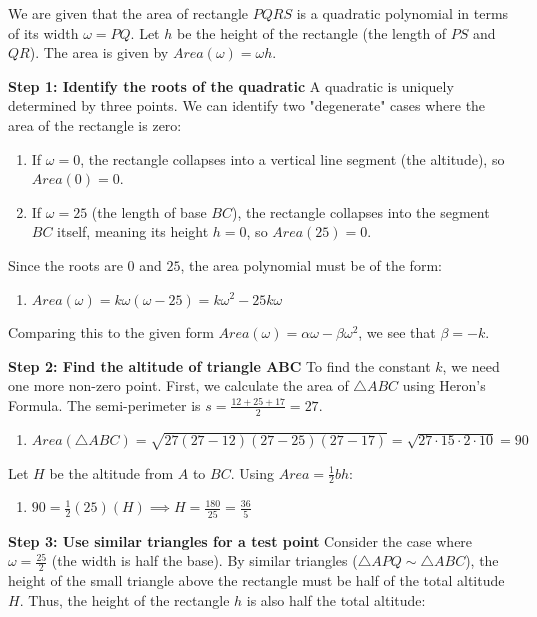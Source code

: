 \begin{enumerate}
We are given that the area of rectangle $PQRS$ is a quadratic polynomial in terms of its width $\omega = PQ$. Let $h$ be the height of the rectangle (the length of $PS$ and $QR$). The area is given by $Area(\omega) = \omega h$.

 \textbf{Step 1: Identify the roots of the quadratic} A quadratic is uniquely determined by three points. We can identify two "degenerate" cases where the area of the rectangle is zero:

 
            \begin{enumerate}
        \item If $\omega = 0$, the rectangle collapses into a vertical line segment (the altitude), so $Area(0) = 0$.
        \item If $\omega = 25$ (the length of base $BC$), the rectangle collapses into the segment $BC$ itself, meaning its height $h = 0$, so $Area(25) = 0$.
            \end{enumerate}
            Since the roots are $0$ and $25$, the area polynomial must be of the form:

 
            \begin{enumerate}[label=(\roman*)]
                \item $Area(\omega) = k\omega(\omega - 25) = k\omega^2 - 25k\omega$
            \end{enumerate}
            Comparing this to the given form $Area(\omega) = \alpha \omega - \beta \omega^2$, we see that $\beta = -k$.

 \textbf{Step 2: Find the altitude of triangle ABC} To find the constant $k$, we need one more non-zero point. First, we calculate the area of $\triangle ABC$ using Heron's Formula. The semi-perimeter is $s = \frac{12+25+17}{2} = 27$.

 
            \begin{enumerate}[label=(\roman*)]
                \item $Area(\triangle ABC) = \sqrt{27(27-12)(27-25)(27-17)} = \sqrt{27 \cdot 15 \cdot 2 \cdot 10} = 90$
            \end{enumerate}
            Let $H$ be the altitude from $A$ to $BC$. Using $Area = \frac{1}{2}bh$:

 
            \begin{enumerate}[label=(\roman*)]
                \item $90 = \frac{1}{2}(25)(H) \implies H = \frac{180}{25} = \frac{36}{5}$
            \end{enumerate}
            \textbf{Step 3: Use similar triangles for a test point} Consider the case where $\omega = \frac{25}{2}$ (the width is half the base). By similar triangles ($\triangle APQ \sim \triangle ABC$), the height of the small triangle above the rectangle must be half of the total altitude $H$. Thus, the height of the rectangle $h$ is also half the total altitude:


\end{enumerate}
